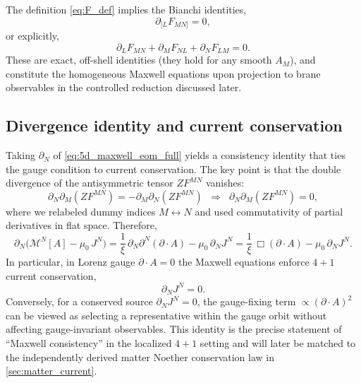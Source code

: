 \documentclass[11pt]{article}
\newcommand{\A}{A}
\newcommand{\F}{F}
\newcommand{\J}{J}
\newcommand{\Z}{Z}
\newcommand{\muo}{\mu_0}
\newcommand{\xigf}{\xi}
\begin{document}
The definition \cref{eq:F_def} implies the Bianchi identities,
\begin{equation}
  \partial_{[L}\F_{MN]} = 0,
  \label{eq:bianchi}
\end{equation}
or explicitly,
\begin{equation}
  \partial_L\F_{MN} + \partial_M\F_{NL} + \partial_N\F_{LM} = 0.
\end{equation}
These are exact, off-shell identities (they hold for any smooth \(\A_M\)),
and constitute the homogeneous Maxwell equations upon projection to brane
observables in the controlled reduction discussed later.

\subsection{Divergence identity and current conservation}
\label{sec:div_identity}

Taking \(\partial_N\) of \cref{eq:5d_maxwell_eom_full} yields a consistency
identity that ties the gauge condition to current conservation. The key point is
that the double divergence of the antisymmetric tensor \(\Z\F^{MN}\) vanishes:
\begin{equation}
  \partial_N\partial_M(\Z\F^{MN})
  = -\partial_M\partial_N(\Z\F^{MN})
  \;\;\Rightarrow\;\;
  \partial_N\partial_M(\Z\F^{MN}) = 0,
  \label{eq:double_div_zero}
\end{equation}
where we relabeled dummy indices \(M\leftrightarrow N\) and used commutativity of
partial derivatives in flat space. Therefore,
\begin{equation}
  \partial_N\big(\mathcal{M}^N[\A]-\muo\,\J^N\big)
  =
  \frac{1}{\xigf}\,\partial_N\partial^N(\partial\!\cdot\!\A)
  - \muo\,\partial_N\J^N
  =
  \frac{1}{\xigf}\,\Box(\partial\!\cdot\!\A)
  - \muo\,\partial_N\J^N.
  \label{eq:div_identity_full}
\end{equation}
In particular, in Lorenz gauge \(\partial\!\cdot\!\A=0\) the Maxwell equations
enforce \(4+1\) current conservation,
\begin{equation}
  \partial_N\J^N = 0.
  \label{eq:current_conservation}
\end{equation}
Conversely, for a conserved source \(\partial_N\J^N=0\), the gauge-fixing term
\(\propto(\partial\!\cdot\!\A)^2\) can be viewed as selecting a representative
within the gauge orbit without affecting gauge-invariant observables. This
identity is the precise statement of ``Maxwell consistency'' in the localized
\(4+1\) setting and will later be matched to the independently derived matter
Noether conservation law in \cref{sec:matter_current}.
\end{document}
